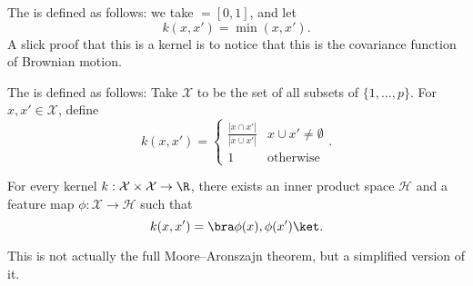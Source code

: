 \documentclass[a4paper]{article}
\begin{document}
\begin{eg}
  The  is defined as follows: we take $\mathcal = [0, 1]$, and let
  \[
    k(x, x') = \min(x, x').
  \]
  A slick proof that this is a kernel is to notice that this is the covariance function of Brownian motion.
\end{eg}

\begin{eg}
  The  is defined as follows: Take $\mathcal{X}$ to be the set of all subsets of $\{1, \ldots, p\}$. For $x, x' \in \mathcal{X}$, define
  \[
    k(x, x') =
    \begin{cases}
      \frac{|x \cap x'|}{|x \cup x'|} & x \cup x' \not= \emptyset\\
      1 & \text{otherwise}
    \end{cases}.
  \]
\end{eg}

\begin{thm}
  For every kernel $k: \mathcal{X} \times \mathcal{X} \to \R$, there exists an inner product space $\mathcal{H}$ and a feature map $\phi: \mathcal{X} \to \mathcal{H}$ such that
  \[
    k(x, x') = \bra \phi(x), \phi(x')\ket.
  \]
\end{thm}
This is not actually the full Moore--Aronszajn theorem, but a simplified version of it.
\end{document}
